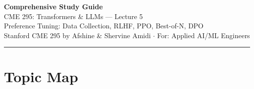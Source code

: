 \documentclass[11pt, a4paper]{article}
\begin{document}
\begin{center}
{\LARGE\bfseries\color{defblue} Comprehensive Study Guide}\\[6pt]
{\Large CME 295: Transformers \& LLMs --- Lecture 5}\\[4pt]
{\normalsize Preference Tuning: Data Collection, RLHF, PPO, Best-of-N, DPO}\\[4pt]
{\small Stanford CME 295 by Afshine \& Shervine Amidi $\cdot$ For: Applied AI/ML Engineers}\\[2pt]
\rule{\textwidth}{0.4pt}
\end{center}

\tableofcontents
\newpage

\section{Topic Map}
\end{document}
